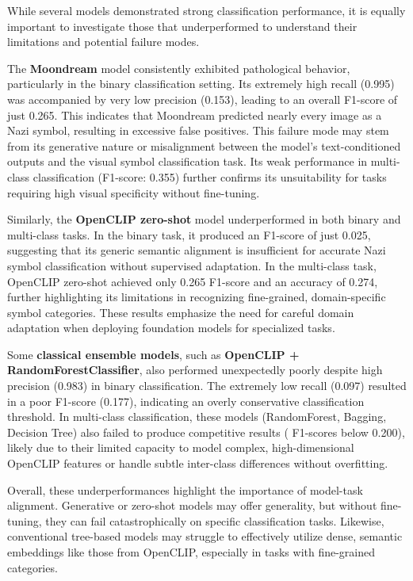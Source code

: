 While several models demonstrated strong classification performance, it is equally important to investigate those
that underperformed to understand their limitations and potential failure modes.

The \textbf{Moondream} model consistently exhibited pathological behavior, particularly in the binary classification
setting. Its extremely high recall (0.995) was accompanied by very low precision (0.153), leading to an overall
F1-score of just 0.265. This indicates that Moondream predicted nearly every image as a Nazi symbol, resulting in
excessive false positives. This failure mode may stem from its generative nature or misalignment between the model’s
text-conditioned outputs and the visual symbol classification task. Its weak performance in multi-class
classification (F1-score: 0.355) further confirms its unsuitability for tasks requiring high visual specificity
without fine-tuning.

Similarly, the \textbf{OpenCLIP zero-shot} model underperformed in both binary and multi-class tasks. In the binary
task, it produced an F1-score of just 0.025, suggesting that its generic semantic alignment is insufficient for
accurate Nazi symbol classification without supervised adaptation. In the multi-class task, OpenCLIP zero-shot achieved
only 0.265 F1-score and an accuracy of 0.274, further highlighting its limitations in recognizing fine-grained,
domain-specific symbol categories. These results emphasize the need for careful domain adaptation when deploying
foundation models for specialized tasks.

Some \textbf{classical ensemble models}, such as \textbf{OpenCLIP + RandomForestClassifier}, also performed
unexpectedly poorly despite high precision (0.983) in binary classification. The extremely low recall (0.097)
resulted in a poor F1-score (0.177), indicating an overly conservative classification threshold. In multi-class
classification, these models (RandomForest, Bagging, Decision Tree) also failed to produce competitive results (
F1-scores below 0.200), likely due to their limited capacity to model complex, high-dimensional OpenCLIP features or
handle subtle inter-class differences without overfitting.

Overall, these underperformances highlight the importance of model-task alignment. Generative or zero-shot models
may offer generality, but without fine-tuning, they can fail catastrophically on specific classification tasks.
Likewise, conventional tree-based models may struggle to effectively utilize dense, semantic embeddings like those
from OpenCLIP, especially in tasks with fine-grained categories.

